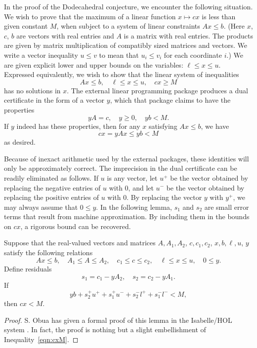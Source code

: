 In the proof of the Dodecahedral conjecture, we encounter the
following situation.  We wish to prove that the maximum of a
linear function 
$x\mapsto c x$ is less than given constant $M$, when subject
to a system of linear constraints $A x \le b$.  (Here $x$, $c$, $b$
are vectors with real entries and $A$ is a matrix with real
entries.  The products are given by matrix multiplication of compatibly sized matrices and vectors. 
We write
a vector inequality $u\le v$
to mean that $u_i \le v_i$ for each coordinate $i$.) We are given
explicit lower and upper bounds on the variables: $\ell \le x \le u$.
Expressed equivalently, we wish to show that the linear 
system of inequalities
  $$
  A x \le b,\quad \ell \le x\le u,\quad c x \ge M
  $$
has no solutions in $x$.
The external linear programming package produces a dual certificate
in the form of a vector $y$, which that package claims to have
the properties 
  \begin{equation}
  y A = c,\quad y\ge 0,\quad y b < M.
  \end{equation}
If $y$ indeed has these properties, then for any $x$ satisfying
$A x \le b$, we have
   \begin{equation}\label{eqn:cxM}
   c x = y A x \le y b < M
   \end{equation}
as desired.

Because of inexact arithmetic used by the external packages, 
these identities will only be
approximately correct.   The imprecision in the dual
certificate can be readily eliminated as follows. If $u$ is
any vector, let $u^+$ be the vector obtained by replacing the
negative entries of $u$ with $0$, and let $u^-$ be the vector
obtained by replacing the positive entries of $u$ with $0$.
By replacing the vector $y$ with $y^+$, we may always assume
that $0\le y$.  In the following lemma, $s_1$ and $s_2$ are
small error terms that result from machine approximation.
By including them in the bounds on $c x$, a rigorous bound
can be recovered.


\begin{lemma}  Suppose that the real-valued vectors and matrices
$A,A_1,A_2$, $c,c_1,c_2$, $x,b,\ell,u$, $y$ satisfy the following
relations
  $$
  A x\le b, \quad A_1 \le A \le A_2,
  \quad c_1 \le c \le c_2,\quad \ell\le x\le u,\quad
  0\le y.
  $$
Define residuals
  $$
   s_1 = c_1 - y A_2,\quad s_2 = c_2  - y A_1.
  $$
If
$$
y b + s_2^+ u^+ + s_1^+ u^- + s_2^- l^+ + s_1^- l^- < M,
$$
then $c x < M$.
\end{lemma}

\begin{proof}  S. Obua has given a formal proof of this lemma in
the Isabelle/HOL system \cite[3.7.2]{Ob}.  In fact, the proof is
nothing but a slight
embellishment of Inequality~\ref{eqn:cxM}.
\end{proof}


